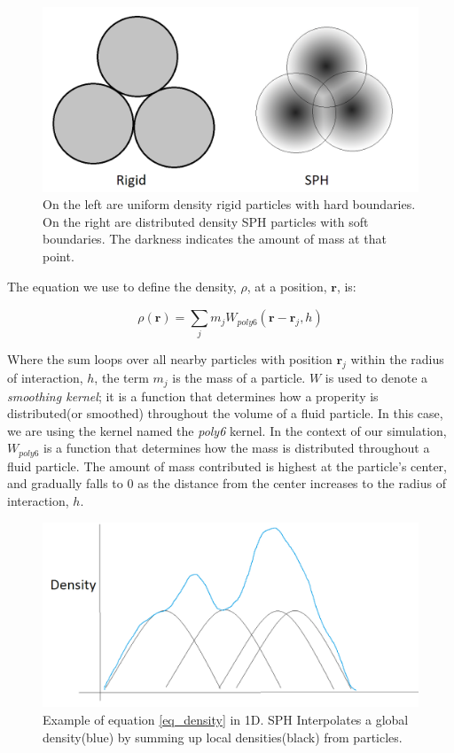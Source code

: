 \documentclass[]{article}
\begin{document}
	\begin{figure}[ht]
	  \centering
	  \includegraphics[width=6.0in]{images/RigidSPH}
	  \caption{On the left are uniform density rigid particles with hard boundaries. On the right are distributed density 
		SPH particles with soft boundaries. The darkness indicates the amount of mass at that point.}
	\end{figure}
	
	The equation we use to define the density, \(\rho\), at a position, \( \mathbf{r} \),  is:
	
	\begin{equation}
		\label{eq_density}
		\rho (\mathbf{r}) = \sum_{j}^{} m_j W_{poly6}(\mathbf{r} - \mathbf{r}_j, h)
	\end{equation}
	
	Where the sum loops over all nearby particles with position \( \mathbf{r}_j \) within the radius of interaction, 
	\( h \), the term \( m_j \) is the mass of a particle. \( W \) is used to denote a \textit{smoothing kernel}; it is
	a function that determines how a properity is distributed(or smoothed) throughout the volume of a fluid particle. 
	In this case, we are using the kernel named the \textit{poly6} kernel. In the context of our simulation, \( W_{poly6} \) 
	is a function that determines how the mass is distributed throughout a fluid particle. The amount of mass contributed is 
	highest at the particle's center, and gradually falls to 0 as the distance from the center increases to the radius of 
	interaction, \( h\).\\
	
	\begin{figure}[ht]
		\centering
		\includegraphics[width=6.0in]{images/SPHSum}
		\caption{Example of equation \ref{eq_density} in 1D. SPH Interpolates a global density(blue) by summing up local
		 densities(black) from particles.}
	\end{figure}
	
\end{document}
